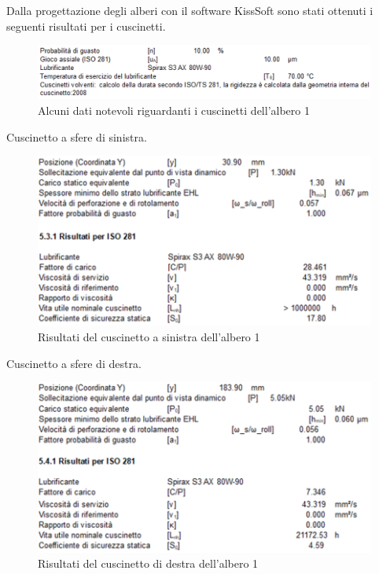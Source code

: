 Dalla progettazione degli alberi con il software KissSoft sono stati ottenuti i seguenti risultati per i cuscinetti.
\begin{figure}[h]
    \centering
    \includegraphics[scale=0.5]{Immagini/DettagliCuscinettiAlbero1.png}
    \caption{Alcuni dati notevoli riguardanti i cuscinetti dell'albero 1}
    \label{fig:DettagliCuscinettiAlbero1}
\end{figure}

Cuscinetto a sfere di sinistra.
\begin{figure}[h]
    \centering
    \includegraphics[scale=0.6]{Immagini/RisultatiCuscinettoSinistraAlbero1.png}
    \caption{Risultati del cuscinetto a sinistra dell'albero 1}
    \label{fig:RisultatiCuscinettoSinistraAlbero1}
\end{figure}
\newpage
Cuscinetto a sfere di destra.
\begin{figure}[h]
    \centering
    \includegraphics[scale=0.6]{Immagini/RisultatiCuscinettoDestraAlbero1.png}
    \caption{Risultati del cuscinetto di destra dell'albero 1}
    \label{fig:RisultatiCuscinettoDestraAlbero1}
\end{figure}

